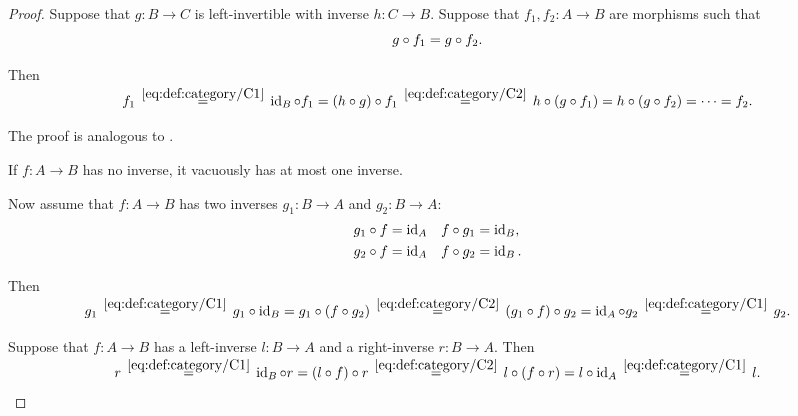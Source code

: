 \begin{proof}
   Suppose that \( g: B \to C \) is left-invertible with inverse \( h: C \to B \). Suppose that \( f_1, f_2: A \to B \) are morphisms such that
  \begin{equation*}
    g \mathbin \circ f_1 = g \mathbin \circ f_2.
  \end{equation*}

  Then
  \begin{equation*}
    f_1
    \reloset {\eqref{eq:def:category/C1}} =
    \id_B \bincirc f_1
    =
    (h \bincirc g) \bincirc f_1
    \reloset {\eqref{eq:def:category/C2}} =
    h \bincirc (g \bincirc f_1)
    =
    h \bincirc (g \bincirc f_2)
    =
    \cdots
    =
    f_2.
  \end{equation*}

   The proof is analogous to .

   If \( f: A \to B \) has no inverse, it vacuously has at most one inverse.

  Now assume that \( f: A \to B \) has two inverses \( g_1: B \to A \) and \( g_2: B \to A \):
  \begin{align*}
    g_1 \mathbin \circ f = \operatorname{id}_A &&& f \mathbin \circ g_1 = \operatorname{id}_B, \\
    g_2 \mathbin \circ f = \operatorname{id}_A &&& f \mathbin \circ g_2 = \operatorname{id}_B.
  \end{align*}

  Then
  \begin{equation*}
    g_1
    \reloset {\eqref{eq:def:category/C1}} =
    g_1 \bincirc \id_B
    =
    g_1 \bincirc (f \bincirc g_2)
    \reloset {\eqref{eq:def:category/C2}} =
    (g_1 \bincirc f) \bincirc g_2
    =
    \id_A \bincirc g_2
    \reloset {\eqref{eq:def:category/C1}} =
    g_2.
  \end{equation*}

   Suppose that \( f: A \to B \) has a left-inverse \( l: B \to A \) and a right-inverse \( r: B \to A \). Then
  \begin{equation*}
    r
    \reloset {\eqref{eq:def:category/C1}} =
    \id_B \bincirc r
    =
    (l \bincirc f) \bincirc r
    \reloset {\eqref{eq:def:category/C2}} =
    l \bincirc (f \bincirc r)
    =
    l \bincirc \id_A
    \reloset {\eqref{eq:def:category/C1}} =
    l.
  \end{equation*}


\end{proof}
